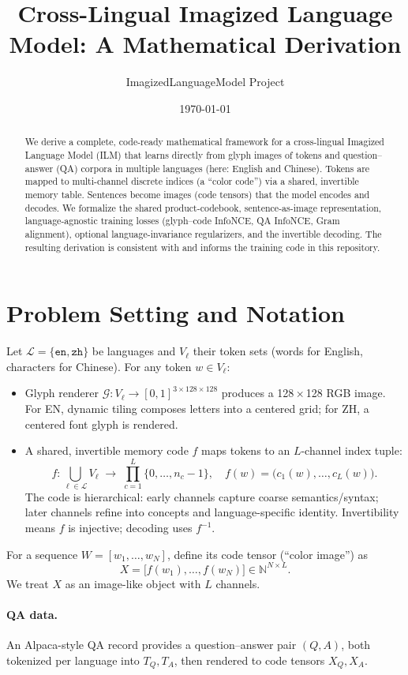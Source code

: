 \documentclass[11pt]{article}
\title{Cross-Lingual Imagized Language Model: A Mathematical Derivation}
\author{ImagizedLanguageModel Project}
\date{\today}
\begin{document}
\maketitle

\begin{abstract}
We derive a complete, code-ready mathematical framework for a cross-lingual Imagized Language Model (ILM) that learns directly from glyph images of tokens and question--answer (QA) corpora in multiple languages (here: English and Chinese). Tokens are mapped to multi-channel discrete indices (a ``color code'') via a shared, invertible memory table. Sentences become images (code tensors) that the model encodes and decodes. We formalize the shared product-codebook, sentence-as-image representation, language-agnostic training losses (glyph--code InfoNCE, QA InfoNCE, Gram alignment), optional language-invariance regularizers, and the invertible decoding. The resulting derivation is consistent with and informs the training code in this repository.
\end{abstract}

\section{Problem Setting and Notation}
Let \(\mathcal{L}=\{\texttt{en},\texttt{zh}\}\) be languages and \(V_\ell\) their token sets (words for English, characters for Chinese). For any token \(w\in V_{\ell}\):
\begin{itemize}
  \item Glyph renderer \(\mathcal{G}: V_\ell \to [0,1]^{3\times 128\times 128}\) produces a 128\,\(\times\)\,128 RGB image. For EN, dynamic tiling composes letters into a centered grid; for ZH, a centered font glyph is rendered.
  \item A shared, invertible memory code \(f\) maps tokens to an \(L\)-channel index tuple:
  \[
    f: \bigcup_{\ell\in\mathcal{L}} V_\ell\;\to\; \prod_{c=1}^L \{0,\ldots,n_c-1\}, \quad f(w)=\big(c_1(w),\ldots,c_L(w)\big).
  \]
  The code is hierarchical: early channels capture coarse semantics/syntax; later channels refine into concepts and language-specific identity. Invertibility means \(f\) is injective; decoding uses \(f^{-1}\).
\end{itemize}
For a sequence \(W=[w_1,\ldots,w_N]\), define its code tensor (``color image'') as
\[
  X=\big[ f(w_1),\ldots,f(w_N)\big] \in \mathbb{N}^{N\times L}.
\]
We treat \(X\) as an image-like object with \(L\) channels.

\paragraph{QA data.} An Alpaca-style QA record provides a question--answer pair \((Q,A)\), both tokenized per language into \(T_Q, T_A\), then rendered to code tensors \(X_Q, X_A\).
\end{document}
